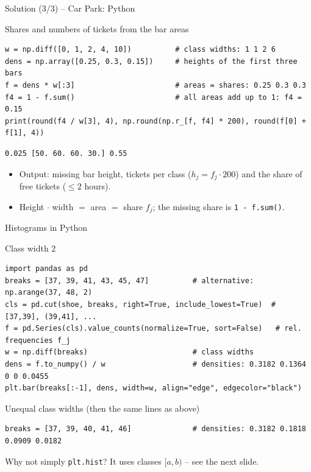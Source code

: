 \documentclass[aspectratio=169,11pt]{beamer}
\begin{document}
\begin{frame}[fragile]{Solution (3/3) -- Car Park: Python}
  \begin{block}{Shares and numbers of tickets from the bar areas}
    \begin{lstlisting}
w = np.diff([0, 1, 2, 4, 10])          # class widths: 1 1 2 6
dens = np.array([0.25, 0.3, 0.15])     # heights of the first three bars
f = dens * w[:3]                       # areas = shares: 0.25 0.3 0.3
f4 = 1 - f.sum()                       # all areas add up to 1: f4 = 0.15
print(round(f4 / w[3], 4), np.round(np.r_[f, f4] * 200), round(f[0] + f[1], 4))
    \end{lstlisting}
    \begin{lstlisting}[style=Pyout]
0.025 [50. 60. 60. 30.] 0.55
    \end{lstlisting}
  \end{block}
  \begin{itemize}
    \item Output: missing bar height, tickets per class ($h_j = f_j \cdot 200$)
          and the share of free tickets ($\le 2$ hours).
    \item Height $\cdot$ width $=$ area $=$ share $f_j$; the missing share is
          \mbox{\texttt{1 - f.sum()}}.
  \end{itemize}
\end{frame}

\begin{frame}[fragile]{Histograms in Python}
  \begin{block}{Class width 2}
    \begin{lstlisting}
import pandas as pd
breaks = [37, 39, 41, 43, 45, 47]          # alternative: np.arange(37, 48, 2)
cls = pd.cut(shoe, breaks, right=True, include_lowest=True)  # [37,39], (39,41], ...
f = pd.Series(cls).value_counts(normalize=True, sort=False)   # rel. frequencies f_j
w = np.diff(breaks)                        # class widths
dens = f.to_numpy() / w                    # densities: 0.3182 0.1364 0 0 0.0455
plt.bar(breaks[:-1], dens, width=w, align="edge", edgecolor="black")
    \end{lstlisting}
  \end{block}

  \begin{block}{Unequal class widths (then the same lines as above)}
    \begin{lstlisting}
breaks = [37, 39, 40, 41, 46]              # densities: 0.3182 0.1818 0.0909 0.0182
    \end{lstlisting}
  \end{block}
  \footnotesize Why not simply \texttt{plt.hist}? It uses classes $[a,b)$ -- see
  the next slide.
\end{frame}
\end{document}
